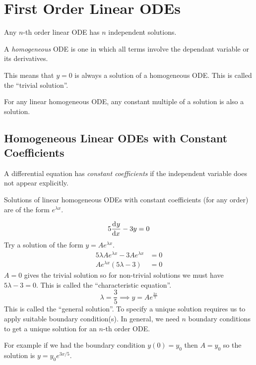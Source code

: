 \documentclass[../main.tex]{subfiles}
\begin{document}
\section{First Order Linear ODEs}
\begin{remark}
  Any $n$-th order linear ODE has $n$ independent solutions.
\end{remark}
\begin{definition}[Homogeneous]
  A \textit{homogeneous} ODE is one in which all terms involve the dependant variable or its derivatives.
\end{definition}
This means that $y = 0$ is always a solution of a homogeneous ODE.
This is called the ``trivial solution''.
\begin{remark}
  For any linear homogeneous ODE, any constant multiple of a solution is also a solution.
\end{remark}
\subsection{Homogeneous Linear ODEs with Constant Coefficients}
\begin{definition}
  A differential equation has \textit{constant coefficients} if the independent variable does not appear explicitly.
\end{definition}

Solutions of linear homogeneous ODEs with constant coefficients (for any order) are of the form $e^{\lambda x}$.
\begin{example}
  \[
    5\deriv{y}{x} - 3y = 0
  \]
  Try a solution of the form $y = Ae^{\lambda x}$.
  \begin{align*}
    5\lambda Ae^{\lambda x} - 3Ae^{\lambda x} &= 0 \\
    Ae^{\lambda x}(5\lambda - 3) &= 0
  \end{align*}
  $A= 0$ gives the trivial solution so for non-trivial solutions we must have $5\lambda - 3 = 0$.
  This is called the ``characteristic equation''.
  \[
    \lambda = \frac{3}{5} \implies y = Ae^{\frac{3x}{5}}
  \]
  This is called the ``general solution''.
  To specify a unique solution requires us to apply suitable boundary condition(s).
  In general, we need $n$ boundary conditions to get a unique solution for an $n$-th order ODE.

  For example if we had the boundary condition $y(0) = y_0$ then $A = y_0$ so the solution is $y = y_0 e^{3x/5}$.
\end{example}
\end{document}
